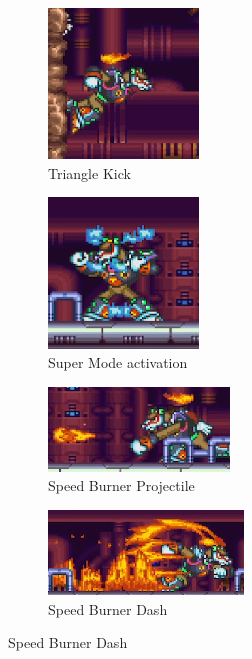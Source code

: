 \begin{figure}[htp]
	\centering
	\begin{subfigure}{0.4\linewidth}
		\centering
		\includegraphics[height=4cm]{figures/X2/Flame_stag/Stag_triangle.png}
		\caption{Triangle Kick}
	\end{subfigure}
	\begin{subfigure}{0.4\linewidth}
		\centering
		\includegraphics[height=4cm]{figures/X2/Flame_stag/Stag_phase_2.png}
		\caption{Super Mode activation}
	\end{subfigure}
	\begin{subfigure}{0.45\linewidth}
		\centering
		\includegraphics[height= 2.25cm]{figures/X2/Flame_stag/Stag_projectile.png}
		\caption{Speed Burner Projectile}
	\end{subfigure}
	\begin{subfigure}{0.45\linewidth}
		\centering
		\includegraphics[height=2.25cm]{figures/X2/Flame_stag/Stag_dash.png}
		\caption{Speed Burner Dash}
	\end{subfigure}
	
\end{figure}
